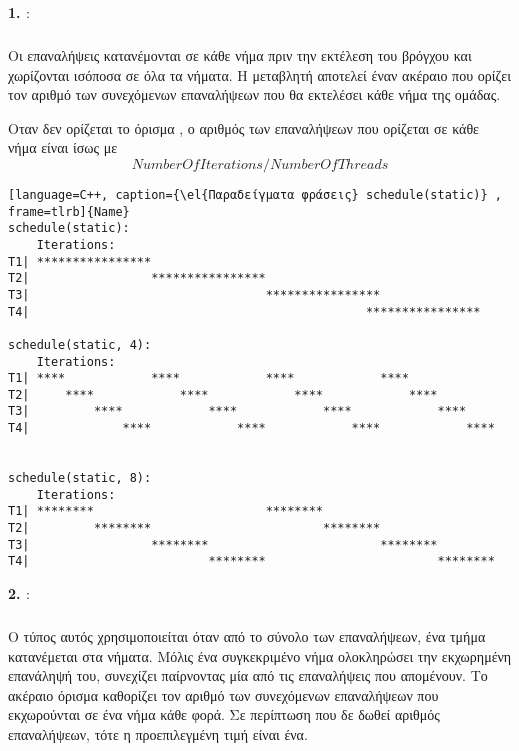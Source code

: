 \textbf{1. \emph{}}:
\subparagraph{}
Οι επαναλήψεις κατανέμονται σε κάθε νήμα πριν την εκτέλεση του βρόγχου και χωρίζονται ισόποσα σε όλα τα νήματα. Η μεταβλητή \emph{} αποτελεί έναν ακέραιο που ορίζει τον αριθμό των συνεχόμενων επαναλήψεων που θα εκτελέσει κάθε νήμα της ομάδας.

Οταν δεν ορίζεται το όρισμα \emph{}, ο αριθμός των επαναλήψεων που ορίζεται σε κάθε νήμα είναι ίσως με $$NumberOfIterations / NumberOfThreads$$
\begin{lstlisting}[language=C++, caption={\el{Παραδείγματα φράσεις} schedule(static)} , frame=tlrb]{Name}
schedule(static):
    Iterations:       
T1| ****************                                                
T2|                 ****************                                
T3|                                 ****************                
T4|                                               ****************

schedule(static, 4): 
    Iterations:
T1| ****            ****            ****            ****            
T2|     ****            ****            ****            ****        
T3|         ****            ****            ****            ****    
T4|             ****            ****            ****            ****


schedule(static, 8):   
    Iterations:
T1| ********                        ********                        
T2|         ********                        ********                
T3|                 ********                        ********        
T4|                         ********                        ********
\end{lstlisting}
\clearpage
\textbf{2. \emph{}}: 
\subparagraph{}
Ο τύπος αυτός χρησιμοποιείται όταν από το σύνολο των επαναλήψεων, ένα τμήμα κατανέμεται στα νήματα. Μόλις ένα συγκεκριμένο νήμα ολοκληρώσει την εκχωρημένη επανάληψή του, συνεχίζει παίρνοντας μία από τις επαναλήψεις που απομένουν. Το ακέραιο όρισμα \emph{} καθορίζει τον αριθμό των συνεχόμενων επαναλήψεων που εκχωρούνται σε ένα νήμα κάθε φορά. Σε περίπτωση που δε δωθεί αριθμός επαναλήψεων, τότε η προεπιλεγμένη τιμή είναι ένα.
\ \\
